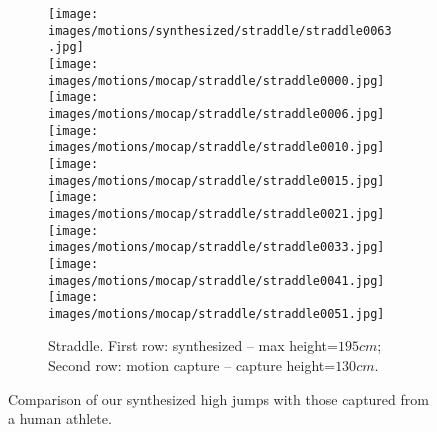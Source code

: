 \begin{figure*}
\begin{subfigure}[b]{\textwidth}
    \texttt{[image: images/motions/synthesized/straddle/straddle0063.jpg]} \\
    \texttt{[image: images/motions/mocap/straddle/straddle0000.jpg]}
    \texttt{[image: images/motions/mocap/straddle/straddle0006.jpg]}
    \texttt{[image: images/motions/mocap/straddle/straddle0010.jpg]}
    \texttt{[image: images/motions/mocap/straddle/straddle0015.jpg]}
    \texttt{[image: images/motions/mocap/straddle/straddle0021.jpg]}
    \texttt{[image: images/motions/mocap/straddle/straddle0033.jpg]}
    \texttt{[image: images/motions/mocap/straddle/straddle0041.jpg]}
    \texttt{[image: images/motions/mocap/straddle/straddle0051.jpg]}
    \caption{Straddle. First row: synthesized -- max height=$195cm$; Second row: motion capture -- capture height=$130cm$.}
    \end{subfigure}
    \caption{Comparison of our synthesized high jumps with those captured from a human athlete.}
    \label{fig:compare-mocap}
\end{figure*}
